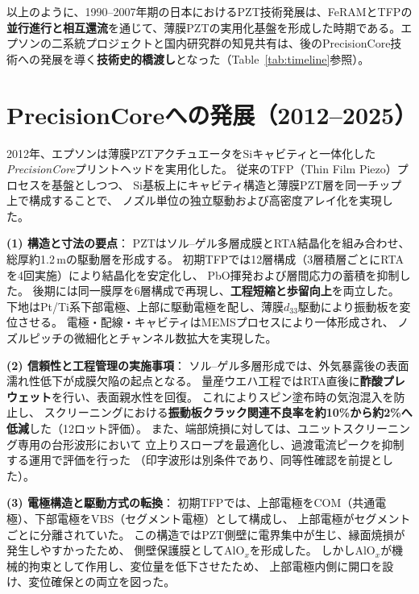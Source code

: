 \documentclass[conference]{IEEEtran}
\begin{document}
\medskip
以上のように、1990--2007年期の日本におけるPZT技術発展は、FeRAMとTFPの\textbf{並行進行と相互還流}を通じて、薄膜PZTの実用化基盤を形成した時期である。エプソンの二系統プロジェクトと国内研究群の知見共有は、後のPrecisionCore技術への発展を導く\textbf{技術史的橋渡し}となった（Table~\ref{tab:timeline}参照）。

\section{PrecisionCoreへの発展（2012--2025）}
2012年、エプソンは薄膜PZTアクチュエータをSiキャビティと一体化した
\textit{PrecisionCore}プリントヘッドを実用化した\cite{uemura2014mems}。
従来のTFP（Thin Film Piezo）プロセスを基盤としつつ、
Si基板上にキャビティ構造と薄膜PZT層を同一チップ上で構成することで、
ノズル単位の独立駆動および高密度アレイ化を実現した。

\medskip
\noindent
\textbf{(1) 構造と寸法の要点}：
PZTはソル--ゲル多層成膜とRTA結晶化を組み合わせ、
総厚約1.2\,\textmu mの駆動層を形成する。
初期TFPでは12層構成（3層積層ごとにRTAを4回実施）により結晶化を安定化し、
PbO揮発および層間応力の蓄積を抑制した。
後期には同一膜厚を6層構成で再現し、\textbf{工程短縮と歩留向上}を両立した。
下地はPt/Ti系下部電極、上部に駆動電極を配し、薄膜$d_{33}$駆動により振動板を変位させる。
電極・配線・キャビティはMEMSプロセスにより一体形成され、
ノズルピッチの微細化とチャンネル数拡大を実現した\cite{uemura2014mems,epson_wp_precisioncore}。

\medskip
\noindent
\textbf{(2) 信頼性と工程管理の実施事項}：
ソル--ゲル多層形成では、外気暴露後の表面濡れ性低下が成膜欠陥の起点となる。
量産ウエハ工程ではRTA直後に\textbf{酢酸プレウェット}を行い、表面親水性を回復。
これによりスピン塗布時の気泡混入を防止し、
スクリーニングにおける\textbf{振動板クラック関連不良率を約10\%から約2\%へ低減}した（12ロット評価）。
また、端部焼損に対しては、ユニットスクリーニング専用の台形波形において
立上りスロープを最適化し、過渡電流ピークを抑制する運用で評価を行った
（印字波形は別条件であり、同等性確認を前提とした）。

\medskip
\noindent
\textbf{(3) 電極構造と駆動方式の転換}：
初期TFPでは、上部電極をCOM（共通電極）、下部電極をVBS（セグメント電極）として構成し、
上部電極がセグメントごとに分離されていた。
この構造ではPZT側壁に電界集中が生じ、縁面焼損が発生しやすかったため、
側壁保護膜としてAlO$_x$を形成した。
しかしAlO$_x$が機械的拘束として作用し、変位量を低下させたため、
上部電極内側に開口を設け、変位確保との両立を図った。
\end{document}
